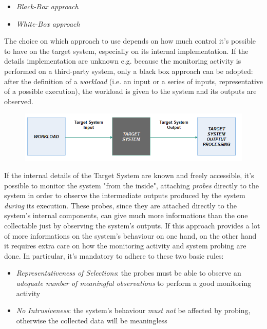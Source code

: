 \begin{itemize}
	\item \textsl{Black-Box approach}
	\item \textsl{White-Box approach}
\end{itemize}

The choice on which approach to use depends on how much control it's possible to have on the target system, especially on its internal implementation. If the details implementation are unknown e.g. because the monitoring activity is performed on a third-party system, only a black box approach can be adopted: after the definition of a \textsl{workload} (i.e. an input or a series of inputs, representative of a possible execution), the workload is given to the system and its outputs are observed.

\begin{figure}[h!]
	\includegraphics[width=\textwidth]{img/black-box.png}
	\caption{}
\end{figure}

If the internal details of the Target System are known and freely accessible, it's possible to monitor the system "from the inside", attaching \textsl{probes} directly to the system in order to observe the intermediate outputs produced by the system \textsl{during} its execution.
These probes, since they are attached directly to the system's internal components, can give much more informations than the one collectable just by observing the system's outputs.
If this approach provides a lot of more informations on the system's behaviour on one hand, on the other hand it requires extra care on how the monitoring activity and system probing are done. In particular, it's mandatory to adhere to these two basic rules:

\begin{itemize}
	\item \textsl{Representativeness of Selections}: the probes must be able to observe an \textsl{adequate number of meaningful observations} to perform a good monitoring activity
	\item \textsl{No Intrusiveness}: the system's behaviour \textsl{must not} be affected by probing, otherwise the collected data will be meaningless 
\end{itemize}

